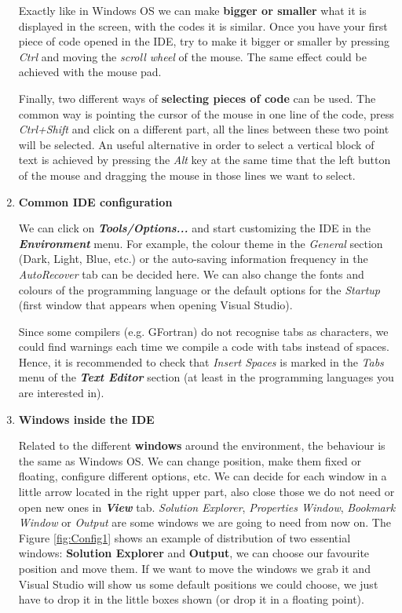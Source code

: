 \begin{enumerate}
    Exactly like in Windows OS we can make \textbf{bigger or smaller} what it is displayed in the screen, with the codes it is similar. Once you have your first piece of code opened in the IDE, try to make it bigger or smaller by pressing \textit{Ctrl} and moving the \textit{scroll wheel} of the mouse. The same effect could be achieved with the mouse pad.
    
    Finally, two different ways of \textbf{selecting pieces of code} can be used. The common way is pointing the cursor of the mouse in one line of the code, press \textit{Ctrl+Shift} and click on a different part, all the lines between these two point will be selected. An useful alternative in order to select a vertical block of text is achieved by pressing the \textit{Alt} key at the same time that the left button of the mouse and dragging the mouse in those lines we want to select.
    
    \item \textbf{Common IDE configuration}
    
    We can click on \textbf{\textit{Tools/Options...}} and start customizing the IDE in the \textbf{\textit{Environment}} menu. For example, the colour theme in the \textit{General} section (Dark, Light, Blue, etc.) or the auto-saving information frequency in the \textit{AutoRecover} tab can be decided here. We can also change the fonts and colours of the programming language or the default options for the \textit{Startup} (first window that appears when opening Visual Studio). 
    
    Since some compilers (e.g. GFortran) do not recognise tabs as characters, we could find warnings each time we compile a code with tabs instead of spaces. Hence, it is recommended to check that \textit{Insert Spaces} is marked in the \textit{Tabs} menu of the \textbf{\textit{Text Editor}} section (at least in the programming languages you are interested in).
    
    \item \textbf{Windows inside the IDE}
    
    Related to the different \textbf{windows} around the environment, the behaviour is the same as Windows OS. We can change position, make them fixed or floating, configure different options, etc. We can decide for each window in a little arrow located in the right upper part, also close those we do not need or open new ones in \textbf{\textit{View}} tab. \textit{Solution Explorer}, \textit{Properties Window}, \textit{Bookmark Window} or \textit{Output} are some windows we are going to need from now on. The Figure \ref{fig:Config1} shows an example of distribution of two essential windows: \textbf{Solution Explorer} and \textbf{Output}, we can choose our favourite position and move them. If we want to move the windows we grab it and Visual Studio will show us some default positions we could choose, we just have to drop it in the little boxes shown (or drop it in a floating point).
    

\end{enumerate}
